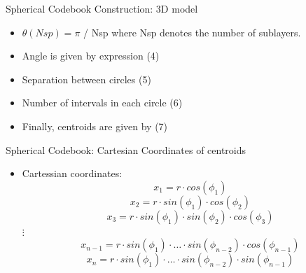 \documentclass[10pt]{beamer}
\begin{document}
\begin{frame}{Spherical Codebook Construction: 3D model}
  \begin{itemize}
    \item $\theta (Nsp) = \pi$ / Nsp where Nsp denotes the number of sublayers.
    \item Angle is given by expression (4)
    \item Separation between circles (5)
    \item Number of intervals in each circle (6)
    \item Finally, centroids are given by (7)
  \end{itemize}
\end{frame}

\begin{frame}{Spherical Codebook: Cartesian Coordinates of centroids}
  \begin{itemize}
    \item Cartessian coordinates:
    \begin{equation*}
      x_{1} = r \cdot cos(\phi_{1})
    \end{equation*}
    \begin{equation*}
      x_{2} = r \cdot sin(\phi_{1}) \cdot cos(\phi_{2})
    \end{equation*}
    \begin{equation*}
      x_{3} = r \cdot sin(\phi_{1}) \cdot sin(\phi_{2}) \cdot cos(\phi_{3})
    \end{equation*}
    \centering $\vdots$
    \begin{equation*}
      x_{n-1} = r \cdot sin(\phi_{1}) \cdot \dotsc \cdot sin(\phi_{n-2}) \cdot cos(\phi_{n-1})
    \end{equation*}
    \begin{equation*}
      x_{n} = r \cdot sin(\phi_{1}) \cdot \dotsc \cdot sin(\phi_{n-2})  \cdot sin(\phi_{n-1})
    \end{equation*}
  \end{itemize}
\end{frame}
\end{document}
